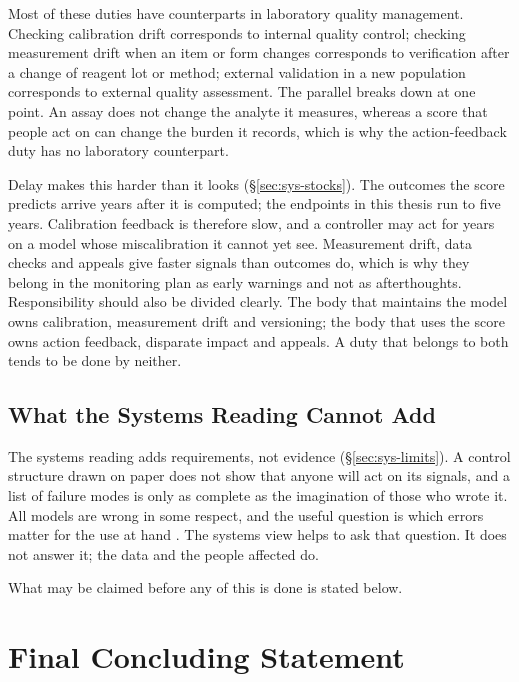 \noindent Most of these duties have counterparts in laboratory quality
management. Checking calibration drift corresponds to internal quality control;
checking measurement drift when an item or form changes corresponds to
verification after a change of reagent lot or method; external validation in a
new population corresponds to external quality assessment. The parallel breaks
down at one point. An assay does not change the analyte it measures, whereas a
score that people act on can change the burden it records, which is why the
action-feedback duty has no laboratory counterpart.

\noindent Delay makes this harder than it looks (\S\ref{sec:sys-stocks}). The
outcomes the score predicts arrive years after it is computed; the endpoints in
this thesis run to five years. Calibration feedback is therefore slow, and a
controller may act for years on a model whose miscalibration it cannot yet see.
Measurement drift, data checks and appeals give faster signals than outcomes do,
which is why they belong in the monitoring plan as early warnings and not as
afterthoughts. Responsibility should also be divided clearly. The body that
maintains the model owns calibration, measurement drift and versioning; the body
that uses the score owns action feedback, disparate impact and appeals. A duty
that belongs to both tends to be done by neither.

\subsection{What the Systems Reading Cannot Add}

The systems reading adds requirements, not evidence (\S\ref{sec:sys-limits}). A
control structure drawn on paper does not show that anyone will act on its
signals, and a list of failure modes is only as complete as the imagination of
those who wrote it. All
models are wrong in some respect, and the useful question is which errors matter
for the use at hand \citep{box_1976}. The systems view helps to ask that
question. It does not answer it; the data and the people affected do.

What may be claimed before any of this is done is stated below.

\section{Final Concluding Statement}
\label{sec:final}

